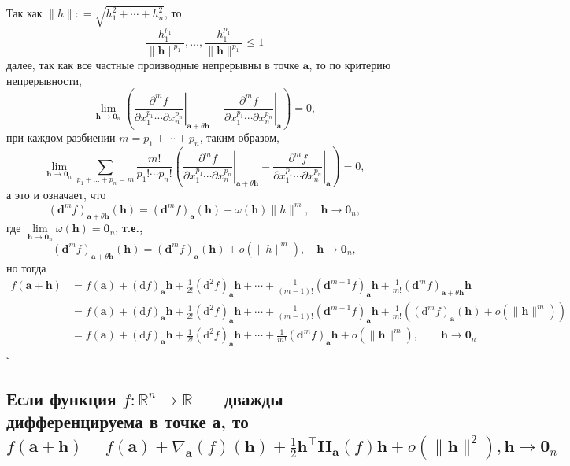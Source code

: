 \documentclass[a4paper]{article}
\newcommand{\qed}{\hfill$\square$}
\newcommand{\m}[1]{\mathbf{#1}}
\begin{document}
Так как $\| h \|: = \sqrt{h_1^2 + \cdots + h_n^2}$, то 
$$
\frac{h_1^{p_1}}{\| \m{h}\|^{p_1}}, \ldots, \frac{h_1^{p_1}}{\| \m{h}\|^{p_1}} \le 1 
$$
далее, так как все частные производные непрерывны в точке $\m{a}$, то по критерию непрерывности,
$$
\lim_{\m{h} \to \m{0}_n} \left( \left.\frac{\partial^m f}{\partial x_1^{p_1} \cdots \partial x_n^{p_n}}\right|_{\m{a}+\theta \m{h}} - \left.\frac{\partial^m f}{\partial x_1^{p_1} \cdots \partial x_n^{p_n}}\right|_{\m{a}} \right) = 0, 
$$
при каждом разбиении $m = p_1 + \cdots + p_n$, таким образом, 
$$
\lim_{\m{h} \to \m{0}_n} \sum_{p_1 + \ldots + p_n = m} \dfrac{m!}{p_1! \cdots p_n!}\left( \left.\frac{\partial^m f}{\partial x_1^{p_1} \cdots \partial x_n^{p_n}}\right|_{\m{a}+\theta \m{h}} - \left.\frac{\partial^m f}{\partial x_1^{p_1} \cdots \partial x_n^{p_n}}\right|_{\m{a}} \right) = 0,
$$
а это и означает, что 
$$
(\m{d}^{m}f)_{\m{a}+ \theta \m{h}}(\m{h}) = (\m{d}^{m}f)_{\m{a}}(\m{h}) + \omega(\m{h}) \|h\|^m, \quad \m{h} \to \m{0}_n,
$$
где $\lim\limits_{\m{h} \to \m{0}_n} \omega(\m{h}) = \m{0}_n$, \textbf{т.е.,}
$$
(\m{d}^{m}f)_{\m{a}+ \theta \m{h}}(\m{h}) = (\m{d}^{m}f)_{\m{a}}(\m{h}) + o(\|h\|^m), \quad \m{h} \to \m{0}_n,
$$
но тогда
$$\begin{aligned}
f(\m{a} + \m{h}) &= f(\m{a}) + (\mathrm{d}f)_\m{a} \m{h} + \frac{1}{2!} (\mathrm{d}^2f)_\m{a}\m{h} + \cdots + \frac{1}{(m-1)!} (\m{d}^{m-1}f)_\m{a}\m{h} + \frac{1}{m!} (\m{d}^{m}f)_{\m{a}+ \theta \m{h}}\m{h} \\
&=f(\m{a}) + (\mathrm{d}f)_\m{a} \m{h} + \frac{1}{2!} (\mathrm{d}^2f)_\m{a}\m{h} + \cdots + \frac{1}{(m-1)!} (\m{d}^{m-1}f)_\m{a}\m{h} + \frac{1}{m!}\left( (\mathrm{d}^mf)_\m{a} (\m{h}) + o(\|\m{h}\|^m) \right) \\
&=f(\m{a}) + (\mathrm{d}f)_\m{a} \m{h} + \frac{1}{2!} (\mathrm{d}^2f)_\m{a}\m{h} + \cdots + \frac{1}{m!} (\m{d}^mf)_\m{a}\m{h} + o(\| \m{h} \|^m), \qquad \m{h} \to \m{0}_n
\end{aligned}$$\qed
\label{2.12}

\subsection{Если функция $f: \mathbb{R}^{n} \rightarrow \mathbb{R}$ — дважды дифференцируема в точке а, то
$f(\mathbf{a}+\mathbf{h})=f(\mathbf{a})+\nabla_{\mathbf{a}}(f)(\mathbf{h})+\frac{1}{2} \mathbf{h}^{\top} \mathbf{H}_{\mathbf{a}}(f) \mathbf{h}+o\left(\|\mathbf{h}\|^{2}\right), \mathbf{h} \rightarrow \mathbf{0}_{n}$}
\end{document}
